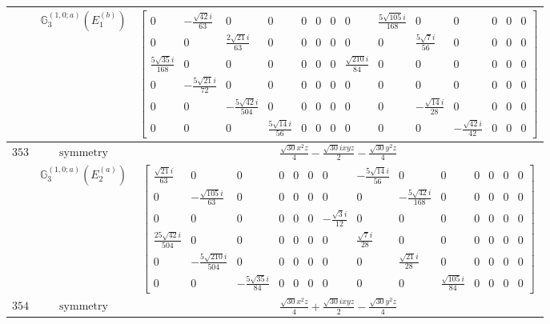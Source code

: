\documentclass[fleqn,8pt,landscape]{jsarticle}
\begin{document}
\begin{longtable}{ccc}
$  $ & $ \mathbb{G}_{3}^{(1,0;a)}(E_{1}^{(b)}) $ & $ \begin{bmatrix} 0 & - \frac{\sqrt{42} i}{63} & 0 & 0 & 0 & 0 & 0 & 0 & \frac{5 \sqrt{105} i}{168} & 0 & 0 & 0 & 0 & 0 \\ 0 & 0 & \frac{2 \sqrt{21} i}{63} & 0 & 0 & 0 & 0 & 0 & 0 & \frac{5 \sqrt{7} i}{56} & 0 & 0 & 0 & 0 \\ \frac{5 \sqrt{35} i}{168} & 0 & 0 & 0 & 0 & 0 & 0 & \frac{\sqrt{210} i}{84} & 0 & 0 & 0 & 0 & 0 & 0 \\ 0 & - \frac{5 \sqrt{21} i}{72} & 0 & 0 & 0 & 0 & 0 & 0 & 0 & 0 & 0 & 0 & 0 & 0 \\ 0 & 0 & - \frac{5 \sqrt{42} i}{504} & 0 & 0 & 0 & 0 & 0 & 0 & - \frac{\sqrt{14} i}{28} & 0 & 0 & 0 & 0 \\ 0 & 0 & 0 & \frac{5 \sqrt{14} i}{56} & 0 & 0 & 0 & 0 & 0 & 0 & - \frac{\sqrt{42} i}{42} & 0 & 0 & 0 \end{bmatrix} $ \\ \hline
$ 353 $ & $ \text{symmetry} $ & $ \frac{\sqrt{30} x^{2} z}{4} - \frac{\sqrt{30} i x y z}{2} - \frac{\sqrt{30} y^{2} z}{4} $ \\
$  $ & $ \mathbb{G}_{3}^{(1,0;a)}(E_{2}^{(a)}) $ & $ \begin{bmatrix} \frac{\sqrt{21} i}{63} & 0 & 0 & 0 & 0 & 0 & 0 & - \frac{5 \sqrt{14} i}{56} & 0 & 0 & 0 & 0 & 0 & 0 \\ 0 & - \frac{\sqrt{105} i}{63} & 0 & 0 & 0 & 0 & 0 & 0 & - \frac{5 \sqrt{42} i}{168} & 0 & 0 & 0 & 0 & 0 \\ 0 & 0 & 0 & 0 & 0 & 0 & - \frac{\sqrt{3} i}{12} & 0 & 0 & 0 & 0 & 0 & 0 & 0 \\ \frac{25 \sqrt{42} i}{504} & 0 & 0 & 0 & 0 & 0 & 0 & \frac{\sqrt{7} i}{28} & 0 & 0 & 0 & 0 & 0 & 0 \\ 0 & - \frac{5 \sqrt{210} i}{504} & 0 & 0 & 0 & 0 & 0 & 0 & \frac{\sqrt{21} i}{28} & 0 & 0 & 0 & 0 & 0 \\ 0 & 0 & - \frac{5 \sqrt{35} i}{84} & 0 & 0 & 0 & 0 & 0 & 0 & \frac{\sqrt{105} i}{84} & 0 & 0 & 0 & 0 \end{bmatrix} $ \\ \hline
$ 354 $ & $ \text{symmetry} $ & $ \frac{\sqrt{30} x^{2} z}{4} + \frac{\sqrt{30} i x y z}{2} - \frac{\sqrt{30} y^{2} z}{4} $ \\

\end{longtable}
\end{document}
